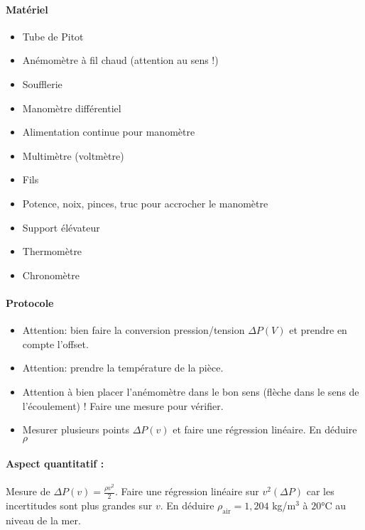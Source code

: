 \documentclass[11pt]{report}
\numberwithin{figure}{section}
\numberwithin{equation}{section}
\numberwithin{table}{section}
\newcommand{\1}{\boldsymbol{1}}
\begin{document}
\begin{tcolorbox}[breakable, enhanced, colback=red!2!white,colframe=mycolor!85!black,title=\textbf{\textbf{Expérience}}]
\paragraph*{Matériel}
\begin{itemize}
		\item Tube de Pitot
		\item Anémomètre à fil chaud (attention au sens !)
		\item Soufflerie
		\item Manomètre différentiel 
		\item Alimentation continue pour manomètre
		\item Multimètre (voltmètre)
		\item Fils
		\item Potence, noix, pinces, truc pour accrocher le manomètre
		\item Support élévateur
		\item Thermomètre
		\item Chronomètre 
\end{itemize}

\paragraph*{Protocole } 

\begin{itemize}[label=$\triangleright$]
\item Attention: bien faire la conversion pression/tension $\Delta P(V)$ et prendre en compte l'offset.
\item Attention: prendre la température de la pièce.
\item Attention à bien placer l'anémomètre dans le bon sens (flèche dans le sens de l'écoulement) ! Faire une mesure pour vérifier.
\item Mesurer plusieurs points $\Delta P(v)$ et faire une régression linéaire. En déduire $\rho$
\end{itemize}

\paragraph*{Aspect quantitatif :} Mesure de $\Delta P(v) = \frac{\rho v^2}{2}$. Faire une régression linéaire sur $v^2(\Delta P)$ car les incertitudes sont plus grandes sur $v$. En déduire $\rho_{\text{air}} = 1,204$ kg/m$^3$ à $20$°C au niveau de la mer.


\end{tcolorbox}
\end{document}
